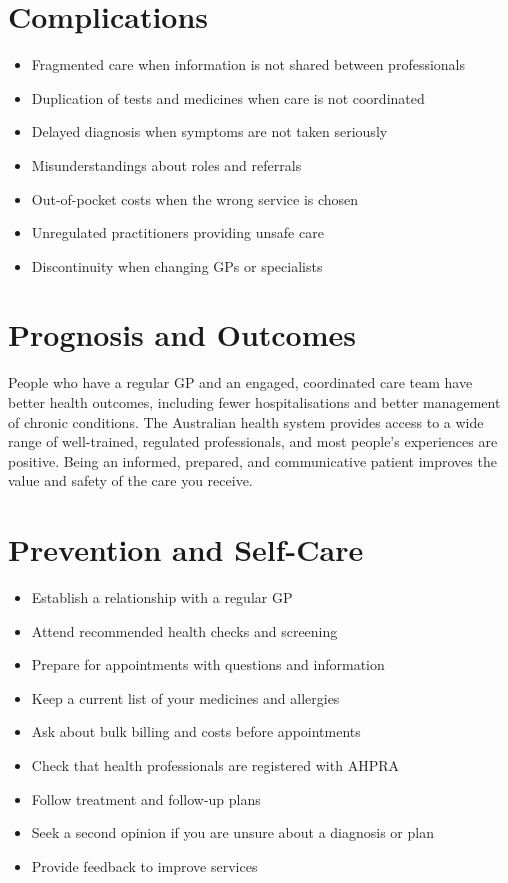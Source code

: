 \section*{Complications}
\begin{itemize}
    \item Fragmented care when information is not shared between professionals
    \item Duplication of tests and medicines when care is not coordinated
    \item Delayed diagnosis when symptoms are not taken seriously
    \item Misunderstandings about roles and referrals
    \item Out-of-pocket costs when the wrong service is chosen
    \item Unregulated practitioners providing unsafe care
    \item Discontinuity when changing GPs or specialists
\end{itemize}

\section*{Prognosis and Outcomes}
People who have a regular GP and an engaged, coordinated care team have better health outcomes, including fewer hospitalisations and better management of chronic conditions. The Australian health system provides access to a wide range of well-trained, regulated professionals, and most people's experiences are positive. Being an informed, prepared, and communicative patient improves the value and safety of the care you receive.

\section*{Prevention and Self-Care}
\begin{itemize}
    \item Establish a relationship with a regular GP
    \item Attend recommended health checks and screening
    \item Prepare for appointments with questions and information
    \item Keep a current list of your medicines and allergies
    \item Ask about bulk billing and costs before appointments
    \item Check that health professionals are registered with AHPRA
    \item Follow treatment and follow-up plans
    \item Seek a second opinion if you are unsure about a diagnosis or plan
    \item Provide feedback to improve services
\end{itemize}

